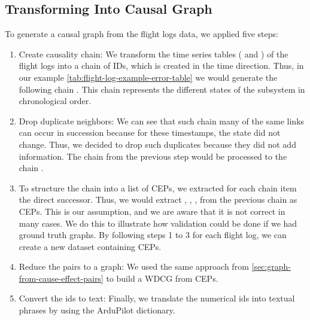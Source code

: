 \subsection{Transforming Into Causal Graph}\label{subsec:transforming-into-causal-graph}
To generate a causal graph from the flight logs data, we applied five steps:
\begin{enumerate}
    \item Create causality chain: We transform the time series tables ( and ) of the flight logs into a chain of IDs, which is created in the time direction.
    Thus, in our example \autoref{tab:flight-log-example-error-table} we would generate the following chain .
    This chain represents the different states of the subsystem in chronological order.
    \item Drop duplicate neighbors: We can see that such chain many of the same links can occur in succession because for these timestamps, the state did not change.
    Thus, we decided to drop such duplicates because they did not add information.
    The chain from the previous step would be processed to the chain .
    \item To structure the chain into a list of \ac{CEP}s, we extracted for each chain item the direct successor.
    Thus, we would extract , , ,  from the previous chain as \ac{CEP}s.
    This is our assumption, and we are aware that it is not correct in many cases.
    We do this to illustrate how validation could be done if we had ground truth graphs.
    By following steps 1 to 3 for each flight log, we can create a new dataset containing \ac{CEP}s.
    \item Reduce the pairs to a graph: We used the same approach from \autoref{sec:graph-from-cause-effect-pairs} to build a \ac{WDCG} from \ac{CEP}s.
    \item Convert the ids to text: Finally, we translate the numerical ids into textual phrases by using the ArduPilot dictionary.
\end{enumerate}


